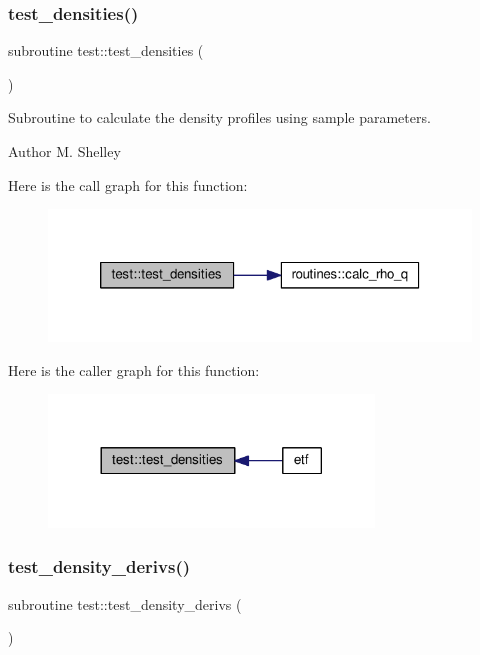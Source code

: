 \subsubsection{\texorpdfstring{test\+\_\+densities()}{test\_densities()}}
{\footnotesize\ttfamily subroutine test\+::test\+\_\+densities (\begin{DoxyParamCaption}{ }\end{DoxyParamCaption})}



Subroutine to calculate the density profiles using sample parameters. 

\begin{DoxyAuthor}{Author}
M. Shelley 
\end{DoxyAuthor}
Here is the call graph for this function\+:
\nopagebreak
\begin{figure}[H]
\begin{center}
\leavevmode
\includegraphics[width=320pt]{namespacetest_ac81b1d59a968470b8ef8a165101df52c_cgraph}
\end{center}
\end{figure}
Here is the caller graph for this function\+:
\nopagebreak
\begin{figure}[H]
\begin{center}
\leavevmode
\includegraphics[width=245pt]{namespacetest_ac81b1d59a968470b8ef8a165101df52c_icgraph}
\end{center}
\end{figure}
\mbox{\label{namespacetest_a50469f436f9c4caa447dafc48e311558}} 
\subsubsection{\texorpdfstring{test\+\_\+density\+\_\+derivs()}{test\_density\_derivs()}}
{\footnotesize\ttfamily subroutine test\+::test\+\_\+density\+\_\+derivs (\begin{DoxyParamCaption}{ }\end{DoxyParamCaption})}



